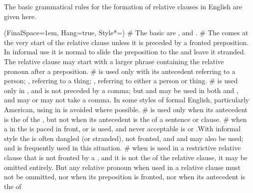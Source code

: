 The basic grammatical rules for the formation of relative clauses in English are given here.
\begin{easylist}[tractatus]
\ListProperties(FinalSpace=1em, Hang=true, Style*=\color{blue})
# The basic  are ,  and .
# The  comes at the very start of the relative clause unless it is preceded by 
a fronted preposition. In informal use it is normal to slide the preposition to the  
and leave it stranded. The relative clause may start with a larger phrase containing the relative pronoun 
after a preposition.\newline
{}
#  is used only with its antecedent referring to a person; 
  , referring to a thing;
  , referring to either a person or thing.
#  is used only in , and is not preceded
by a comma; but  and  may be used in both  and
, and may or may not take a comma. In some styles of formal 
English, particularly American, using  in  is avoided
where possible.
#  is used only when its antecedent is the  of the 
, but not when its antecedent is the  
of a sentence or clause.
# when a  in the  is paced in front,
  or  is used, and never acceptable is 
or .With informal style the  is often dangled (or stranded),
not fronted, and  and  may also be used; and 
is frequently used in this situation.
# when  is used in a restrictive relative clause that is not fronted by
a , and it is not the  of the relative clause, it may
be omitted entirely.
But any relative pronoun when used in a  relative clause must 
not be ommitted, nor when its preposition is fronted, nor when its antecedent is the  of

\end{easylist}
